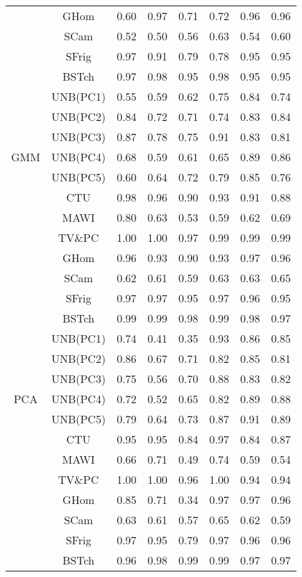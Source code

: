 \documentclass{article}
\begin{document}
\begin{tiny}
\begin{longtable}{|c|c|c|c|c|c|c|c|}
\cmidrule{2-8}
&GHom & 0.60 & 0.97 & 0.71 & 0.72 & 0.96 & 0.96\\ 
&SCam & 0.52 & 0.50 & 0.56 & 0.63 & 0.54 & 0.60\\ 
&SFrig & 0.97 & 0.91 & 0.79 & 0.78 & 0.95 & 0.95 \\ 
&BSTch & 0.97 & 0.98 & 0.95 & 0.98 & 0.95 & 0.95  \\ 
\midrule
\multirow{7}{*}{GMM} &UNB(PC1) & 0.55 & 0.59 & 0.62 & 0.75 & 0.84 & 0.74  \\ 
&UNB(PC2) & 0.84 & 0.72 & 0.71 & 0.74 & 0.83 & 0.84  \\ 
&UNB(PC3) & 0.87 & 0.78 & 0.75 & 0.91 & 0.83 & 0.81 \\ 
&UNB(PC4) & 0.68 & 0.59 & 0.61 & 0.65 & 0.89 & 0.86 \\ 
&UNB(PC5) & 0.60 & 0.64 & 0.72 & 0.79 & 0.85 & 0.76 \\ 
\cmidrule{2-8}
&CTU & 0.98 & 0.96 & 0.90 & 0.93 & 0.91 & 0.88\\ 
\cmidrule{2-8}
&MAWI & 0.80 & 0.63 & 0.53 & 0.59 & 0.62 & 0.69\\ 
\cmidrule{2-8}
&TV\&PC & 1.00 & 1.00 & 0.97 & 0.99 & 0.99 & 0.99\\ 
\cmidrule{2-8}
&GHom & 0.96 & 0.93 & 0.90 & 0.93 & 0.97 & 0.96\\ 
&SCam & 0.62 & 0.61 & 0.59 & 0.63 & 0.63 & 0.65\\ 
&SFrig & 0.97 & 0.97 & 0.95 & 0.97 & 0.96 & 0.95 \\ 
&BSTch & 0.99 & 0.99 & 0.98 & 0.99 & 0.98 & 0.97  \\ 
\midrule
\multirow{7}{*}{PCA} &UNB(PC1) & 0.74 & 0.41 & 0.35 & 0.93 & 0.86 & 0.85  \\ 
&UNB(PC2) & 0.86 & 0.67 & 0.71 & 0.82 & 0.85 & 0.81  \\ 
&UNB(PC3) & 0.75 & 0.56 & 0.70 & 0.88 & 0.83 & 0.82 \\ 
&UNB(PC4) & 0.72 & 0.52 & 0.65 & 0.82 & 0.89 & 0.88 \\ 
&UNB(PC5) & 0.79 & 0.64 & 0.73 & 0.87 & 0.91 & 0.89 \\ 
\cmidrule{2-8}
&CTU & 0.95 & 0.95 & 0.84 & 0.97 & 0.84 & 0.87\\ 
\cmidrule{2-8}
&MAWI & 0.66 & 0.71 & 0.49 & 0.74 & 0.59 & 0.54\\ 
\cmidrule{2-8}
&TV\&PC & 1.00 & 1.00 & 0.96 & 1.00 & 0.94 & 0.94\\ 
\cmidrule{2-8}
&GHom & 0.85 & 0.71 & 0.34 & 0.97 & 0.97 & 0.96\\ 
&SCam & 0.63 & 0.61 & 0.57 & 0.65 & 0.62 & 0.59\\ 
&SFrig & 0.97 & 0.95 & 0.79 & 0.97 & 0.96 & 0.96 \\ 
&BSTch & 0.96 & 0.98 & 0.99 & 0.99 & 0.97 & 0.97  \\ 
\bottomrule
\end{longtable}
\end{tiny}
\end{document}

